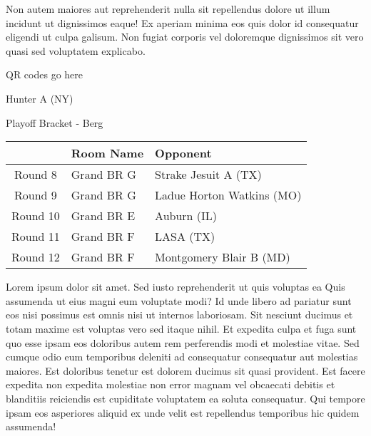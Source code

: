\documentclass{article}%
\begin{document}
\newline%
Non autem maiores aut reprehenderit nulla sit repellendus dolore ut illum incidunt ut dignissimos eaque! Ex aperiam minima eos quis dolor id consequatur eligendi ut culpa galisum. Non fugiat corporis vel doloremque dignissimos sit vero quasi sed voluptatem explicabo.\newline%
\newline%
%
\vspace*{30pt}%
\begin{center}%
\begin{Huge}%
QR codes go here%
\end{Huge}%
\end{center}%
\newpage%
\begin{center}%
\begin{Huge}%
Hunter A (NY)%
\end{Huge}%
\vspace*{8pt}%
\linebreak%
\begin{Large}%
Playoff Bracket {-} Berg%
\end{Large}%
\end{center}%
\begin{tabularx}{\textwidth}{|c|Y|Y|}%
\hline%
&Room Name&Opponent\\%
\hline%
Round 8&Grand BR G&Strake Jesuit A (TX)\\%
Round 9&Grand BR G&Ladue Horton Watkins (MO)\\%
Round 10&Grand BR E&Auburn (IL)\\%
Round 11&Grand BR F&LASA (TX)\\%
Round 12&Grand BR F&Montgomery Blair B (MD)\\%
\hline%
\end{tabularx}%
\vspace*{8pt}%
\linebreak%
\newline%
\newline%
Lorem ipsum dolor sit amet. Sed iusto reprehenderit ut quis voluptas ea Quis assumenda ut eius magni eum voluptate modi? Id unde libero ad pariatur sunt eos nisi possimus est omnis nisi ut internos laboriosam. Sit nesciunt ducimus et totam maxime est voluptas vero sed itaque nihil. Et expedita culpa et fuga sunt quo esse ipsam eos doloribus autem rem perferendis modi et molestiae vitae.\newline%
\newline%
Sed cumque odio eum temporibus deleniti ad consequatur consequatur aut molestias maiores. Est doloribus tenetur est dolorem ducimus sit quasi provident. Est facere expedita non expedita molestiae non error magnam vel obcaecati debitis et blanditiis reiciendis est cupiditate voluptatem ea soluta consequatur. Qui tempore ipsam eos asperiores aliquid ex unde velit est repellendus temporibus hic quidem assumenda!\newline%
\end{document}
